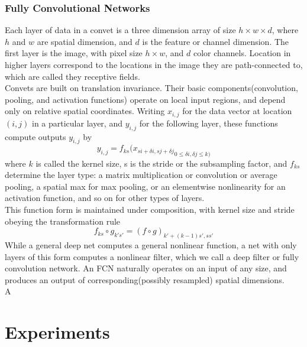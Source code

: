 \documentclass[final]{cvpr}
\begin{document}
\subsubsection{Fully Convolutional Networks}
Each layer of data in a convet is a three dimension array of size $h\times w\times d$, where $h$ and $w$ are spatial dimension, and $d$ is the feature or channel dimension. The first layer is the image, with pixel size $h\times w$, and $d$ color channels. Location in higher layers correspond to the locations in the image they are path-connected to, which are called they receptive fields.\\
\indent Convets are built on translation invariance. Their basic components(convolution, pooling, and activation functions) operate on local input regions, and depend only on relative spatial coordinates. Writing $x_{i,j}$ for the data vector at location $(i,j)$ in a particular layer, and $y_{i,j}$ for the following layer, these functions compute outputs $y_{i,j}$ by
\[y_{i,j} = f_{ks}({x_{si+\delta i, sj+\delta j}}_{0\leq \delta i,\delta j\leq k)}\]
where $k$ is called the kernel size, s is the stride or the subsampling factor, and $f_{ks}$ determine the layer type: a matrix multiplication or convolution or average pooling, a spatial max for max pooling, or an elementwise nonlinearity for an activation function, and so on for other types of layers.\\
\indent This function form is maintained under composition, with kernel size and  stride obeying the transformation rule
\[ f_{ks}\circ g_{k's'} = (f\circ g)_{k'+(k-1)s',ss'}\]
While a general deep net computes a general nonlinear function, a net with only layers of this form computes a nonlinear filter, which we call a deep filter or fully convolution network. An FCN naturally operates on an input of any size, and produces an output of corresponding(possibly resampled) spatial dimensions.\\
\indent A  
\section{Experiments}
\end{document}
